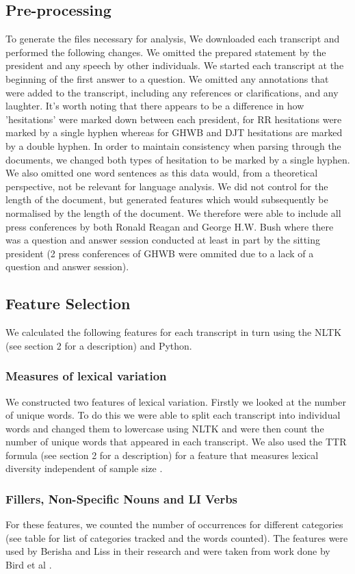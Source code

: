 \documentclass[10pt]{article}
\begin{document}
\subsection{Pre-processing}
To generate the files necessary for analysis, We downloaded each transcript and performed the following changes. We omitted the prepared statement by the president and any speech by other individuals. We started each transcript at the beginning of the first answer to a question. We omitted any annotations that were added to the transcript, including any references or clarifications, and any laughter. It's worth noting that there appears to be a difference in how 'hesitations' were marked down between each president, for RR hesitations were marked by a single hyphen whereas for GHWB and DJT hesitations are marked by a double hyphen. In order to maintain consistency when parsing through the documents, we changed both types of hesitation to be marked by a single hyphen. We also omitted one word sentences as this data would, from a theoretical perspective, not be relevant for language analysis. We did not control for the length of the document, but generated features which would subsequently be normalised by the length of the document. We therefore were able to include all press conferences by both Ronald Reagan and George H.W. Bush where there was a question and answer session conducted at least in part by the sitting president (2 press conferences of GHWB were ommited due to a lack of a question and answer session).
\subsection{Feature Selection}
We calculated the following features for each transcript in turn using the NLTK (see section 2 for a description) \cite{Bird2009} and Python. 
\par 
\subsubsection{Measures of lexical variation}
We constructed two features of lexical variation. Firstly we looked at the number of unique words. To do this we were able to split each transcript into individual words and changed them to lowercase using NLTK and were then count the number of unique words that appeared in each transcript. We also used the TTR formula (see section 2 for a description) for a feature that measures lexical diversity independent of sample size \cite{Richards1987}. 
\subsubsection{Fillers, Non-Specific Nouns and LI Verbs}
For these features, we counted the number of occurrences for different categories (see table for list of categories tracked and the words counted). The features were used by Berisha and Liss in their research \cite{Berisha2015} and were taken from work done by Bird et al \cite{Bird2000}. 
\end{document}
